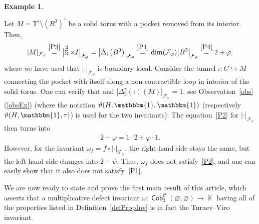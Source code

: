 \documentclass[pdftex]{sigma}
\DeclareMathOperator{\K}{\mathbb{K}}
\DeclareMathOperator{\Sp}{\mathbb{S}}
\DeclareMathOperator{\Cob}{\mathsf{Cob}}
\DeclareMathOperator{\calc}{\mathcal{C}}
\numberwithin{equation}{section}
\theoremstyle{definition}
\newtheorem{Example}[Example]{Example}
\begin{document}
\begin{Example}
\begin{enumerate}[(i)]
 Let $M = \mathbb{T}^s \setminus (B^3)^{\circ}$ be a solid torus with a pocket removed from its interior. Then,
 \begin{align*}
 |M|_{\mathcal{F}_{\varphi}} \overset{\rm \ref{P3}}{=} \bigl|{\Sp^2 \times I}\bigr|_{\mathcal{F}_{\varphi}} = \bigl|\Delta_1\bigl(B^3\bigr)\bigr|_{\mathcal{F}_{\varphi}} \overset{\rm \ref{P1}}{=} \dim(\mathcal{F}_{\varphi})\bigl|B^3\bigr|_{\mathcal{F}_{\varphi}} \overset{\rm \ref{P4}}{=} 2+\varphi,
 \end{align*}
 where we have used that $|\cdot|_{\mathcal{F}_{\varphi}}$ is boundary local. Consider the tunnel $\iota\colon C \hookrightarrow M$ connecting the pocket with itself along a non-contractible loop in interior of the solid torus. One can verify that  and $|\Delta_2^{\tau}(\iota)(M)|_{\mathcal{F}_{\varphi}} = 1$, see Observation~\ref{obs}\,(\ref{obsEx}) (where the notation $\vartheta(H, \mathbbm{1},\mathbbm{1})$ (respectively $\vartheta(H, \mathbbm{1},\tau)$) is used for the two invariants). The equation~\ref{P2} for $|\cdot|_{\mathcal{F}_{\varphi}}$ then turns into
 \begin{align*}
 2+\varphi = 1\cdot 2 + \varphi \cdot 1.
 \end{align*}
 However, for the invariant $\omega_f = f \circ |\cdot|_{\mathcal{F}_{\varphi}}$, the right-hand side stays the same, but the left-hand side changes into $2 + \psi$. Thus, $\omega_f$ does not satisfy~\ref{P2}, and one can easily show that it also does not satisfy~\ref{P1}.
 \end{enumerate}
\end{Example}

We are now ready to state and prove the first main result of this article, which asserts that a multiplicative defect invariant $\omega \colon \Cob_3^{\calc}(\varnothing, \varnothing) \rightarrow \K$ having all of the properties listed in Definition~\ref{defPropInv} is in fact the Turaev--Viro invariant.
\end{document}
